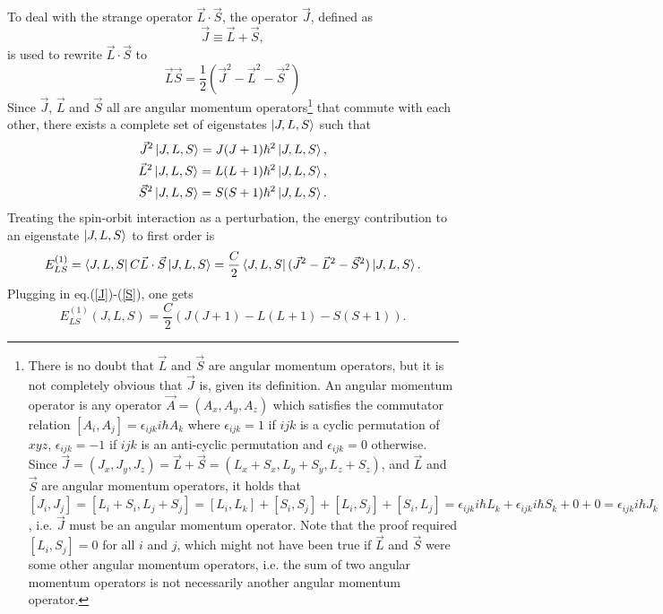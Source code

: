 \documentclass[a4paper]{article}
\begin{document}
To deal with the strange operator $\vec{L}\cdot\vec{S}$, the operator $\vec{J}$, defined as
\begin{equation}
\vec{J} \equiv \vec{L} + \vec{S},
\end{equation}
is used to rewrite $\vec{L}\cdot\vec{S}$ to
\begin{equation}
\vec{L}\vec{S}=\frac{1}{2}(\vec{J}^2-\vec{L}^2-\vec{S}^2)
\end{equation}
Since $\vec{J}$, $\vec{L}$ and $\vec{S}$ all are angular momentum operators\footnote{There is no doubt that $\vec{L}$ and $\vec{S}$ are angular momentum operators, but it is not completely obvious that $\vec{J}$ is, given its definition. An angular momentum operator is any operator $\vec{A}=(A_x,A_y,A_z)$ which satisfies the commutator relation $[A_i,A_j]= \epsilon_{ijk} i \hbar A_k$ where $\epsilon_{ijk}=1$ if $ijk$ is a cyclic permutation of $xyz$, $\epsilon_{ijk}=-1$ if $ijk$ is an anti-cyclic permutation and $\epsilon_{ijk}=0$ otherwise. Since $\vec{J} =(J_x,J_y,J_z)=\vec{L} + \vec{S} = (L_x+S_x,L_y+S_y,L_z+S_z)$, and $\vec{L}$ and $\vec{S}$ are angular momentum operators, it holds that $[J_i,J_j]=[L_i+S_i,L_j+S_j]=[L_i,L_k] + [S_i,S_j] + [L_i,S_j] + [S_i,L_j] = \epsilon_{ijk} i \hbar L_k + \epsilon_{ijk} i \hbar S_k  + 0 + 0 = \epsilon_{ijk} i \hbar J_k$, i.e. $\vec{J}$ must be an angular momentum operator. Note that the proof required $[L_i,S_j]=0$ for all $i$ and $j$, which might not have been true if $\vec{L}$ and $\vec{S}$ were some other angular momentum operators, i.e. the sum of two angular momentum operators is not necessarily another angular momentum operator.} that commute with each other, there exists a complete set of eigenstates $\Ket{J,L,S}$ such that
\begin{eqnarray}
\vec{J}^2 \Ket{J,L,S} = J(J+1) \hbar^2 \Ket{J,L,S},		\label{J}	\\
\vec{L}^2 \Ket{J,L,S} = L(L+1) \hbar^2 \Ket{J,L,S},					\\
\vec{S}^2 \Ket{J,L,S} = S(S+1) \hbar^2 \Ket{J,L,S}.		\label{S}
\end{eqnarray}
Treating the spin-orbit interaction as a perturbation, the energy contribution to an eigenstate $\Ket{J,L,S}$ to first order is
\begin{equation}
E_{LS}^{(1)} = \Bra{J,L,S} C \vec{L}\cdot\vec{S} \Ket{J,L,S} = \frac{C}{2} \Bra{J,L,S} (\vec{J}^2-\vec{L}^2-\vec{S}^2) \Ket{J,L,S}.
\end{equation}
Plugging in eq.(\ref{J})-(\ref{S}), one gets
\begin{equation}
E_{LS}^{(1)}(J,L,S) = \frac{C}{2} (J(J+1) - L(L+1) - S(S+1)).
\end{equation}
\end{document}
